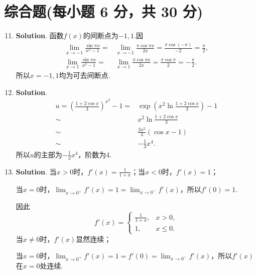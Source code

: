 \documentclass[../main.tex]{subfiles}
\begin{document}
\section{综合题(每小题 6 分，共 30 分)}
\begin{enumerate}
    \setcounter{enumi}{10}
    \item \textbf{Solution}. 函数$f(x)$的间断点为$-1,1$.因
          \[
              \begin{aligned}
                  \lim_{x\to-1}\frac{\sin\pi x}{x^2-1}= {} & \lim_{x\to-1}\frac{\pi\cos\pi x}{2x}=\frac{\pi\cos(-\pi)}{-2}=\frac{\pi}{2}, \\
                  \lim_{x\to1}\frac{\sin\pi x}{x^2-1}= {}  & \lim_{x\to1}\frac{\pi\cos\pi x}{2x}=\frac{\pi\cos\pi}{2}=-\frac{\pi}{2}.
              \end{aligned}
          \]
          所以$x=-1,1$均为可去间断点.

    \item \textbf{Solution}.
          \[
              \begin{aligned}
                  u=\left(\frac{1+2\cos x}{3}\right)^{x^2}-1= {} & \exp\left({x^2\ln\frac{1+2\cos x}{3}}\right)-1 \\
                  \sim  {}                                       & x^{2}\ln\frac{1+2\cos x}{3}                    \\
                  \sim  {}                                       & \frac{2x^2}{3}\left(\cos x-1\right)            \\
                  \sim  {}                                       & -\frac{1}{3}x^{4}.
              \end{aligned}
          \]
          所以$u$的主部为$-\frac{1}{3}x^{4}$，阶数为4.

    \item \textbf{Solution}. 当$x>0$时，$f'(x)=\frac{1}{1+x}$；当$x<0$时，$f
              '(x)=1$；

          当$x=0$时，$\lim_{x\to0^+}f'(x)=1=\lim_{x\to0^-}f'(x)$，所以$f'(0)=1$.

          因此
          \[
              f'(x)=
              \begin{cases}
                  \frac{1}{1+x}, & x>0,    \\
                  1,             & x\leq0.
              \end{cases}
          \]
          当$x\neq0$时，$f'(x)$显然连续；

          当$x=0$时，$\lim_{x\to0^+}f'(x)=1=f'(0)=\lim_{x\to0^-}f'(x)$，所以$f'(x)$在$x
              =0$处连续.


\end{enumerate}
\end{document}
